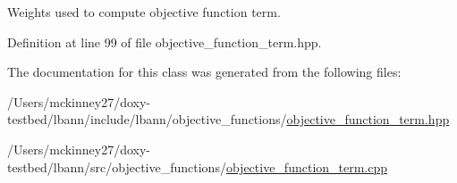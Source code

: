 Weights used to compute objective function term. 

Definition at line 99 of file objective\+\_\+function\+\_\+term.\+hpp.



The documentation for this class was generated from the following files\+:\begin{DoxyCompactItemize}
\item 
/\+Users/mckinney27/doxy-\/testbed/lbann/include/lbann/objective\+\_\+functions/\hyperlink{objective__function__term_8hpp}{objective\+\_\+function\+\_\+term.\+hpp}\item 
/\+Users/mckinney27/doxy-\/testbed/lbann/src/objective\+\_\+functions/\hyperlink{objective__function__term_8cpp}{objective\+\_\+function\+\_\+term.\+cpp}\end{DoxyCompactItemize}
